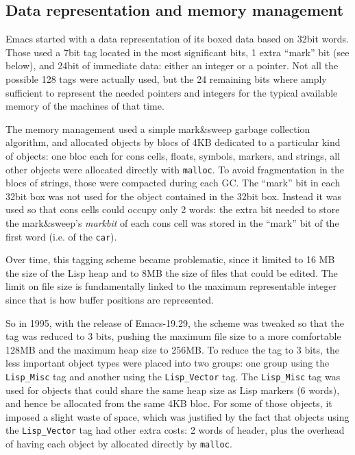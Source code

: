 \documentclass[format=acmsmall, review=false, screen=true]{acmart}
\begin{document}
\subsection{Data representation and memory management}
\label{sec:data-representation}

Emacs started with a data representation of its boxed data based on 32bit
words.  Those used a 7bit tag located in the most significant bits, 1 extra
``mark'' bit (see below), and 24bit of immediate data: either an integer or
a pointer.  Not all the possible 128 tags were actually used, but the 24
remaining bits where amply sufficient to represent the needed pointers and
integers for the typical available memory of the machines of that time.

The memory management used a simple mark\&sweep garbage collection
algorithm, and allocated objects by blocs of 4KB dedicated to a particular
kind of objects: one bloc each for cons cells, floats, symbols, markers, and
strings, all other objects were allocated directly with \texttt{malloc}.
To avoid fragmentation in the blocs of strings, those were compacted during
each GC.  The ``mark'' bit in each 32bit box was not used for the object
contained in the 32bit box.  Instead it was used so that cons cells could
occupy only 2 words: the extra bit needed to store the mark\&sweep's
\emph{markbit} of each cons cell was stored in the ``mark'' bit of the first
word (i.e. of the \texttt{car}).

Over time, this tagging scheme became problematic, since it limited to 16 MB
the size of the Lisp heap and to 8MB the size of files that could be edited.
The limit on file size is fundamentally linked to the maximum representable
integer since that is how buffer positions are represented.

So in 1995, with the release of Emacs-19.29,
the scheme was tweaked so that the tag was reduced to
3 bits, pushing the maximum file size to a more comfortable 128MB and the
maximum heap size to 256MB.  To reduce the tag to 3 bits, the less important
object types were placed into two groups: one group using the
\texttt{Lisp\_Misc} tag and another using the \texttt{Lisp\_Vector} tag.
The \texttt{Lisp\_Misc} tag was used for objects that could share the same
heap size as Lisp markers (6 words), and hence be allocated from the same
4KB bloc.  For some of those objects, it imposed a slight waste of space,
which was justified by the fact that objects using the \texttt{Lisp\_Vector}
tag had other extra costs: 2 words of header, plus the overhead of having
each object by allocated directly by \texttt{malloc}.
\end{document}
